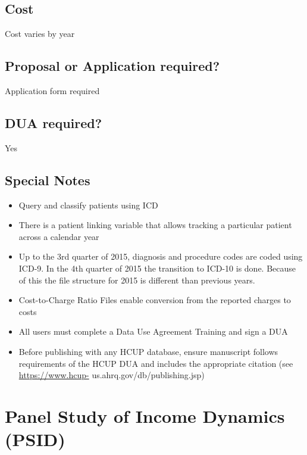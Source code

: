 \documentclass[
]{book}
\providecommand{\tightlist}{%
  \setlength{\itemsep}{0pt}\setlength{\parskip}{0pt}}
\begin{document}
\hypertarget{cost-71}{%
\section{Cost}\label{cost-71}}

Cost varies by year

\hypertarget{proposal-or-application-required-71}{%
\section{Proposal or Application required?}\label{proposal-or-application-required-71}}

Application form required

\hypertarget{dua-required-71}{%
\section{DUA required?}\label{dua-required-71}}

Yes

\hypertarget{special-notes-71}{%
\section{Special Notes}\label{special-notes-71}}

\begin{itemize}
\tightlist
\item
  Query and classify patients using ICD
\item
  There is a patient linking variable that allows tracking a particular patient across a calendar year
\item
  Up to the 3rd quarter of 2015, diagnosis and procedure codes are coded using ICD-9. In the 4th quarter of 2015 the transition to ICD-10 is done. Because of this the file structure for 2015 is different than previous years.
\item
  Cost-to-Charge Ratio Files enable conversion from the reported charges to costs
\item
  All users must complete a Data Use Agreement Training and sign a DUA
\item
  Before publishing with any HCUP database, ensure manuscript follows requirements of the HCUP DUA and includes the appropriate citation (see \url{https://www.hcup-} us.ahrq.gov/db/publishing.jsp)
\end{itemize}

\mainmatter

\hypertarget{panel-study-of-income-dynamics-psid}{%
\chapter{Panel Study of Income Dynamics (PSID)}\label{panel-study-of-income-dynamics-psid}}
\end{document}
